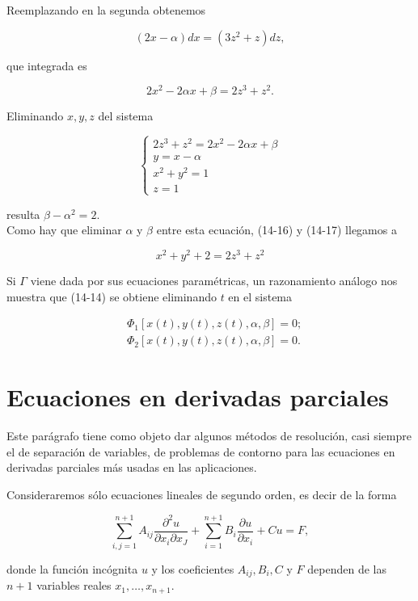 \documentclass[10pt]{article}
\theoremstyle{plain}
\theoremstyle{definition}
\theoremstyle{remark}
\begin{document}
Reemplazando en la segunda obtenemos

$$
(2 x-\alpha) d x=\left(3 z^{2}+z\right) d z,
$$

que integrada es


\begin{equation*}
2 x^{2}-2 \alpha x+\beta=2 z^{3}+z^{2} . \tag{14-17}
\end{equation*}


Eliminando $x, y, z$ del sistema

$$
\left\{\begin{array}{l}
2 z^{3}+z^{2}=2 x^{2}-2 \alpha x+\beta \\
y=x-\alpha \\
x^{2}+y^{2}=1 \\
z=1
\end{array}\right.
$$

resulta $\beta-\alpha^{2}=2$.\\
Como hay que eliminar $\alpha$ y $\beta$ entre esta ecuación, (14-16) y (14-17) llegamos a

$$
x^{2}+y^{2}+2=2 z^{3}+z^{2}
$$

Si $\Gamma$ viene dada por sus ecuaciones paramétricas, un razonamiento análogo nos muestra que (14-14) se obtiene eliminando $t$ en el sistema

$$
\begin{aligned}
& \Phi_{1}[x(t), y(t), z(t), \alpha, \beta]=0 ; \\
& \Phi_{2}[x(t), y(t), z(t), \alpha, \beta]=0 .
\end{aligned}
$$

\section{Ecuaciones en derivadas parciales}
Este parágrafo tiene como objeto dar algunos métodos de resolución, casi siempre el de separación de variables, de problemas de contorno para las ecuaciones en derivadas parciales más usadas en las aplicaciones.

Consideraremos sólo ecuaciones lineales de segundo orden, es decir de la forma


\begin{equation*}
\sum_{i, j=1}^{n+1} A_{i j} \frac{\partial^{2} u}{\partial x_{i} \partial x_{J}}+\sum_{i=1}^{n+1} B_{i} \frac{\partial u}{\partial x_{i}}+C u=F, \tag{15-1}
\end{equation*}


donde la función incógnita $u$ y los coeficientes $A_{i j}, B_{i}, C$ y $F$ dependen de las $n+1$ variables reales $x_{1}, \ldots, x_{n+1}$.
\end{document}
